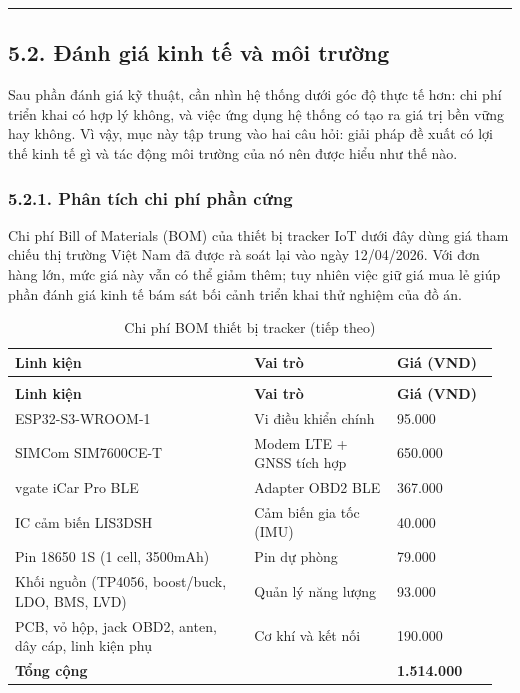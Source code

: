 \documentclass[a4paper]{extarticle}
\newcommand{\thesissettableid}[2]{%
  \renewcommand{\thetable}{#1}%
  \renewcommand{\theHtable}{#2}%
}
\begin{document}
\begin{center}\rule{0.5\linewidth}{0.5pt}\end{center}

\subsection{5.2. Đánh giá kinh tế và môi
trường}\label{52-ux111uxe1nh-giuxe1-kinh-tux1ebf-vuxe0-muxf4i-trux1b0ux1eddng}

Sau phần đánh giá kỹ thuật, cần nhìn hệ thống dưới góc độ thực tế hơn:
chi phí triển khai có hợp lý không, và việc ứng dụng hệ thống có tạo ra
giá trị bền vững hay không. Vì vậy, mục này tập trung vào hai câu hỏi:
giải pháp đề xuất có lợi thế kinh tế gì và tác động môi trường của nó
nên được hiểu như thế nào.

\subsubsection{5.2.1. Phân tích chi phí phần
cứng}\label{521-phuxe2n-tuxedch-chi-phuxed-phux1ea7n-cux1ee9ng}

Chi phí Bill of Materials (BOM) của thiết bị tracker IoT dưới đây dùng
giá tham chiếu thị trường Việt Nam đã được rà soát lại vào ngày
12/04/2026. Với đơn hàng lớn, mức giá này vẫn có thể giảm thêm; tuy
nhiên việc giữ giá mua lẻ giúp phần đánh giá kinh tế bám sát bối cảnh
triển khai thử nghiệm của đồ án.


{\thesissettableid{5.4}{tab-ch5-chi-phi-bom-thiet-bi-tracker}
\def\LTcaptype{table}
\begin{longtable}{|L{0.479\linewidth}|L{0.282\linewidth}|L{0.204\linewidth}|}
\caption{Chi phí BOM thiết bị tracker}\label{tab:ch5-chi-phi-bom-thiet-bi-tracker}\\
\hline \textbf{Linh kiện} & \textbf{Vai trò} & \textbf{Giá (VND)} \\
\hline
\endfirsthead
\caption[]{Chi phí BOM thiết bị tracker (tiếp theo)}\\
\hline \textbf{Linh kiện} & \textbf{Vai trò} & \textbf{Giá (VND)} \\
\hline
\endhead
\hline
\endfoot
\endlastfoot
ESP32-S3-WROOM-1 & Vi điều khiển chính & 95.000 \\\hline
SIMCom SIM7600CE-T & Modem LTE + GNSS tích hợp & 650.000 \\\hline
vgate iCar Pro BLE & Adapter OBD2 BLE & 367.000 \\\hline
IC cảm biến LIS3DSH & Cảm biến gia tốc (IMU) & 40.000 \\\hline
Pin 18650 1S (1 cell, 3500mAh) & Pin dự phòng & 79.000 \\\hline
Khối nguồn (TP4056, boost/buck, LDO, BMS, LVD) & Quản lý năng lượng &
93.000 \\\hline
PCB, vỏ hộp, jack OBD2, anten, dây cáp, linh kiện phụ & Cơ khí và kết nối &
190.000 \\\hline
\textbf{Tổng cộng} & & \textbf{1.514.000} \\\hline
\end{longtable}
}
\end{document}
